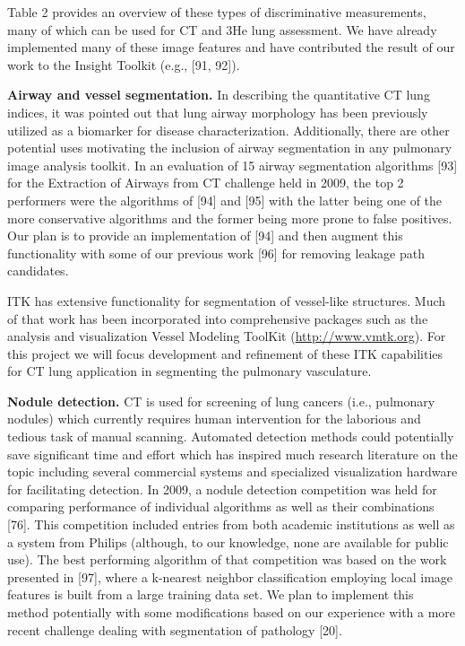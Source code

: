 \documentclass[11pt,]{article}
\begin{document}


Table 2 provides an overview of these types of discriminative
measurements, many of which can be used for CT and 3He lung assessment.
We have already implemented many of these image features and have
contributed the result of our work to the Insight Toolkit (e.g., {[}91,
92{]}).

\textbf{Airway and vessel segmentation.} In describing the quantitative
CT lung indices, it was pointed out that lung airway morphology has been
previously utilized as a biomarker for disease characterization.
Additionally, there are other potential uses motivating the inclusion of
airway segmentation in any pulmonary image analysis toolkit. In an
evaluation of 15 airway segmentation algorithms {[}93{]} for the
Extraction of Airways from CT challenge held in 2009, the top 2
performers were the algorithms of {[}94{]} and {[}95{]} with the latter
being one of the more conservative algorithms and the former being more
prone to false positives. Our plan is to provide an implementation of
{[}94{]} and then augment this functionality with some of our previous
work {[}96{]} for removing leakage path candidates.

ITK has extensive functionality for segmentation of vessel-like
structures. Much of that work has been incorporated into comprehensive
packages such as the analysis and visualization Vessel Modeling ToolKit
(\url{http://www.vmtk.org}). For this project we will focus development
and refinement of these ITK capabilities for CT lung application in
segmenting the pulmonary vasculature.

\textbf{Nodule detection.} CT is used for screening of lung cancers
(i.e., pulmonary nodules) which currently requires human intervention
for the laborious and tedious task of manual scanning. Automated
detection methods could potentially save significant time and effort
which has inspired much research literature on the topic including
several commercial systems and specialized visualization hardware for
facilitating detection. In 2009, a nodule detection competition was held
for comparing performance of individual algorithms as well as their
combinations {[}76{]}. This competition included entries from both
academic institutions as well as a system from Philips (although, to our
knowledge, none are available for public use). The best performing
algorithm of that competition was based on the work presented in
{[}97{]}, where a k-nearest neighbor classification employing local
image features is built from a large training data set. We plan to
implement this method potentially with some modifications based on our
experience with a more recent challenge dealing with segmentation of
pathology {[}20{]}.
\end{document}
